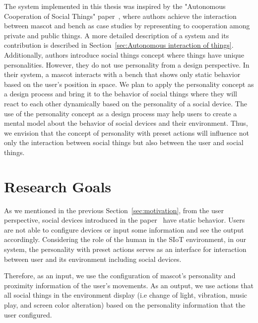 The system implemented in this thesis was inspired by the "Autonomous Cooperation of Social Things"
paper~\cite{okada2016autonomous},
where authors achieve the interaction between mascot and bench as case
studies by representing to cooperation among private and public things.
A more detailed description of a system and its contribution is described
in Section~\ref{sec:Autonomous interaction of things}.
Additionally, authors introduce social things concept where things have unique personalities.
However, they do not use personality from a design perspective.
In their system, a mascot interacts with a bench that shows only static behavior based on the user's position in space.
We plan to apply the personality concept as a design process and bring it to the
behavior of social things where they will react to each other dynamically based on the personality of a social device.
The use of the personality concept as a design process may help users to
create a mental model about the behavior of social devices and their environment.
Thus, we envision that the concept of personality with preset actions will influence
not only the interaction between social things but also between the user and social things.

\section{Research Goals}
\label{sec:research-goals}
As we mentioned in the previous Section~\ref{sec:motivation}, from the user perspective, social devices introduced
in the paper~\cite{okada2016autonomous} have static behavior.
Users are not able to configure devices or input some information and see the output accordingly.
Considering the role of the human in the SIoT environment, in our system, the personality with preset
actions serves as an interface for interaction between user and its environment including social devices.

Therefore, as an input, we use the configuration of mascot's personality and proximity
information of the user's movements.
As an output, we use actions that all social things in the environment display
(i.e change of light, vibration, music play, and screen color alteration) based
on the personality information that the user configured.

